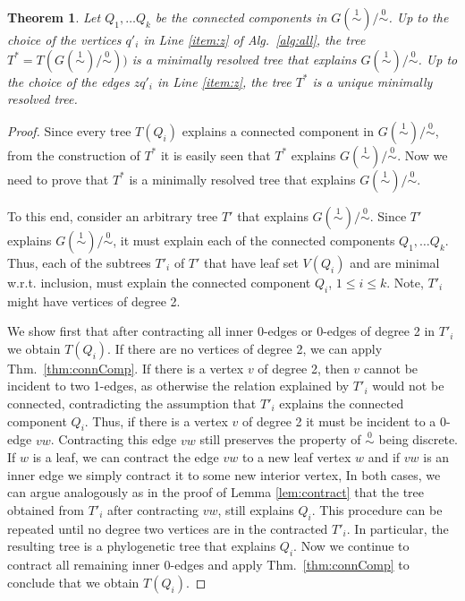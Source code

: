 \documentclass[smallextended]{svjour3}
\newcommand{\rev}[1]{\begingroup\color{blue}#1\endgroup}
\newcommand{\Ro}{\mathrel{\overset{0}{\sim}}}
\newcommand{\Rl}{\mathrel{\overset{1}{\sim}}}
\newtheorem{thm}{Theorem}
\begin{document}
\begin{thm}
  Let $Q_1,\dots Q_k$ be the connected components in $G(\Rl)/\Ro$.  Up to
  the choice of the vertices $q'_i$ in Line \ref{item:z} of Alg.\
  \ref{alg:all}, the tree $T^* = T(G(\Rl)/\Ro))$ is 
	a \rev{minimally resolved 
	tree that explains $G(\Rl)/\Ro$.
	Up to the choice of the edges $zq'_i$ in Line \ref{item:z}, 
	the tree $T^*$ is a unique minimally resolved tree.}
  \label{thm:star-tree}
\end{thm}
\begin{proof}
 \rev{ Since every tree $T(Q_i)$ explains a connected component in $G(\Rl)/\Ro$,
  from the construction of $T^*$ it is easily seen that $T^*$ explains
  $G(\Rl)/\Ro$.  Now we need to prove that $T^*$ is a minimally resolved
  tree that explains $G(\Rl)/\Ro$.

  To this end, consider an arbitrary tree $T'$ that explains $G(\Rl)/\Ro$. 
  Since  $T'$ explains $G(\Rl)/\Ro$, it must explain each of the connected
  components  $Q_1,\dots Q_k$. Thus, each of the subtrees  $T'_i$ of
  $T'$ that have leaf set $V(Q_i)$ and are minimal w.r.t. inclusion, 
  must explain the connected component $Q_i$, $1\le i \le k$. 
  Note, $T'_i$ might have vertices of degree 2. 

  We show first that after contracting all inner 0-edges or 0-edges of degree 2
  in $T'_i$ we obtain $T(Q_i)$.
  If there are no vertices of degree 2, we can apply Thm.\ \ref{thm:connComp}. 
  If there is a vertex $v$ of degree 2, then $v$ cannot be incident to 
  two 1-edges, as otherwise
  the relation explained by $T'_i$ would not be connected, contradicting the assumption
  that $T'_i$ explains the connected component $Q_i$. 
  Thus, if there is a vertex $v$ of degree 2 it must be incident to a 0-edge $vw$. 
  Contracting this edge $vw$ still preserves the property of $\Ro$ being discrete. 
  If $w$ is a leaf, we can contract the edge 
  $vw$ to a new leaf vertex $w$ and if  $vw$ is an inner edge we simply contract
  it to some new interior vertex, In both cases, 
  we can argue analogously as in the proof of 
  Lemma \ref{lem:contract} that the tree obtained from $T'_i$ after contracting
  $vw$, still explains $Q_i$.
  This procedure can be repeated until no degree two vertices are in the 
  contracted $T'_i$. In particular, the resulting tree is a phylogenetic tree that explains 
	$Q_i$. Now  we continue to contract all remaining 
   inner 0-edges and apply Thm.\ \ref{thm:connComp} to conclude that 
   we obtain $T(Q_i)$. 

}
\end{proof}
\end{document}
